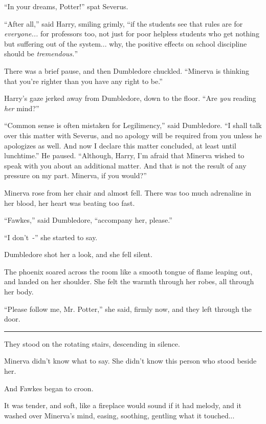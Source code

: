 ``In your dreams, Potter!'' spat Severus.

``After all,'' said Harry, smiling grimly, ``if the students see that rules are for \emph{everyone...} for professors too, not just for poor helpless students who get nothing but suffering out of the system... why, the positive effects on school discipline should be \emph{tremendous.}''

There was a brief pause, and then Dumbledore chuckled. ``Minerva is thinking that you're righter than you have any right to be.''

Harry's gaze jerked away from Dumbledore, down to the floor. ``Are \emph{you} reading \emph{her} mind?''

``Common sense is often mistaken for Legilimency,'' said Dumbledore. ``I shall talk over this matter with Severus, and no apology will be required from you unless he apologizes as well. And now I declare this matter concluded, at least until lunchtime.'' He paused. ``Although, Harry, I'm afraid that Minerva wished to speak with you about an additional matter. And that is not the result of any pressure on my part. Minerva, if you would?''

Minerva rose from her chair and almost fell. There was too much adrenaline in her blood, her heart was beating too fast.

``Fawkes,'' said Dumbledore, ``accompany her, please.''

``I don't~-'' she started to say.

Dumbledore shot her a look, and she fell silent.

The phoenix soared across the room like a smooth tongue of flame leaping out, and landed on her shoulder. She felt the warmth through her robes, all through her body.

``Please follow me, Mr. Potter,'' she said, firmly now, and they left through the door.

\begin{center}\rule{3in}{0.4pt}\end{center}

They stood on the rotating stairs, descending in silence.

Minerva didn't know what to say. She didn't know this person who stood beside her.

And Fawkes began to croon.

It was tender, and soft, like a fireplace would sound if it had melody, and it washed over Minerva's mind, easing, soothing, gentling what it touched...

